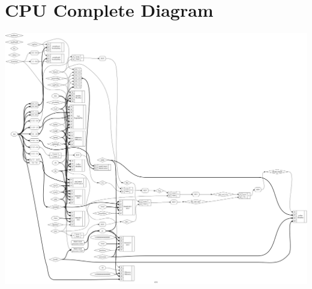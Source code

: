 \documentclass{article}
\newenvironment{problem}[1]{
  \nobreak\section*{#1}
}{}
\begin{document}
  \pagebreak
  \begin{problem}{CPU Complete Diagram}
    \includegraphics[scale=0.15]{../images/bitmap.png}
  \end{problem}
\end{document}
